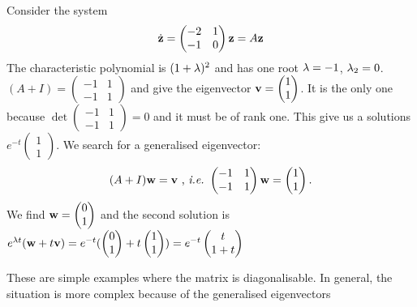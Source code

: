 \begin{exemple}
Consider the system
$$ \dot{\mathbf{z}}=
\begin{pmatrix} -2&1\\-1&0 \end{pmatrix}\mathbf{z} =A\mathbf{z}
$$
The characteristic polynomial is $(1+\lambda)^2$ and has one root $\lambda=-1$, $\lambda_2=0$.$(A+I)=\begin{pmatrix} -1&1\\-1&1 \end{pmatrix}$ and give the eigenvector $\mathbf{v}=\begin{pmatrix}1\\1\end{pmatrix}$. It is the only one because $\det \begin{pmatrix} -1&1\\-1&1 \end{pmatrix} =0$ and it must be of rank one. This give us a solutions $e^{-t}\begin{pmatrix}1\\1\end{pmatrix}$. We search for a generalised eigenvector:
$$(A+I)\mathbf{w}=\mathbf{v} \text{ , \emph{i.e.\ }} \begin{pmatrix} -1&1\\-1&1 \end{pmatrix}\mathbf{w}= \begin{pmatrix}1\\1\end{pmatrix}.$$
We find $\mathbf{w}=\begin{pmatrix}0\\1\end{pmatrix}$ and the second solution is $e^{\lambda t}(\mathbf{w}+t\mathbf{v}) = e^{-t}(\begin{pmatrix}0\\1\end{pmatrix}+t\begin{pmatrix}1\\1\end{pmatrix}) = e^{-t}\begin{pmatrix}t\\1+t\end{pmatrix}$
\end{exemple}
These are simple examples where the matrix is diagonalisable. In general, the situation is more complex because of the generalised eigenvectors

